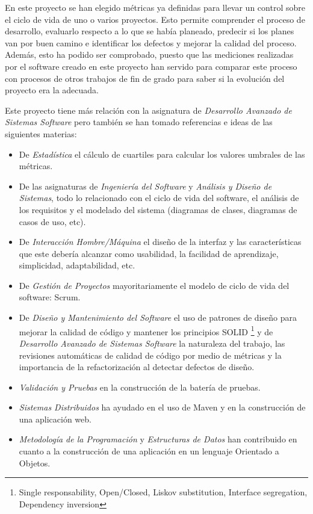 En este proyecto se han elegido métricas ya definidas para llevar un control sobre el ciclo de vida de uno o varios proyectos. Esto permite comprender el proceso de desarrollo, evaluarlo respecto a lo que se había planeado, predecir si los planes van por buen camino e identificar los defectos y mejorar la calidad del proceso. Además, esto ha podido ser comprobado, puesto que las mediciones realizadas por el software creado en este proyecto han servido para comparar este proceso con procesos de otros trabajos de fin de grado para saber si la evolución del proyecto era la adecuada.

Este proyecto tiene más relación con la asignatura de \textit{Desarrollo Avanzado de Sistemas Software} pero también se han tomado referencias e ideas de las siguientes materias: 
\begin{itemize}
	\tightlist
	\item De \textit{Estadística} el cálculo de cuartiles para calcular los valores umbrales de las métricas.
	\item De las asignaturas de \textit{Ingeniería del Software} y \textit{Análisis y Diseño de Sistemas}, todo lo relacionado con el ciclo de vida del software, el análisis de los requisitos y el modelado del sistema (diagramas de clases, diagramas de casos de uso, etc).
	\item De \textit{Interacción Hombre/Máquina}  el diseño de la interfaz y las características que este debería alcanzar como usabilidad, la facilidad de aprendizaje, simplicidad, adaptabilidad, etc.
	\item De \textit{Gestión de Proyectos} mayoritariamente el modelo de ciclo de vida del software: Scrum.
	\item De \textit{Diseño y Mantenimiento del Software} el uso de patrones de diseño para mejorar la calidad de código y mantener los principios SOLID  \footnote{Single responsability, Open/Closed, Liskov substitution, Interface segregation, Dependency inversion} y de \textit{Desarrollo Avanzado de Sistemas Software} la naturaleza del trabajo, las revisiones automáticas de calidad de código por medio de métricas y la importancia de la refactorización al detectar defectos de diseño.
	\item \textit{Validación y Pruebas} en la construcción de la batería de pruebas.
	\item \textit{Sistemas Distribuidos} ha ayudado en el uso de Maven y en la construcción de una aplicación web.
	\item \textit{Metodología de la Programación} y \textit{Estructuras de Datos} han contribuido en cuanto a la construcción de una aplicación en un lenguaje Orientado a Objetos.
\end{itemize}

